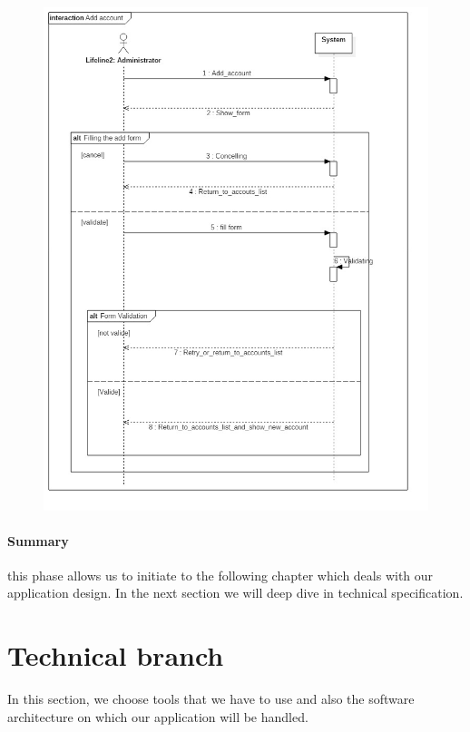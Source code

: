  \begin{figure}[H]
	\centering
	\includegraphics[height=0.7\textheight]{fig01/AddAccount}
	\label{fig:FilialesEtClients}
\end{figure}

\paragraph{Summary}
\label{sec:sec01}
this phase allows us to initiate to the following chapter which deals with our application design. In the next section
we will deep dive in technical specification.
\newpage
\section{Technical branch}
\label{subsec:subsec01}
In this section, we choose tools that we have to use and also the software architecture on which our application will be handled.


